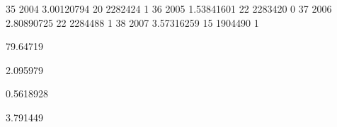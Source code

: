 \documentclass[a4paper]{article}                %
\begin{document}
\begin{Schunk}
\begin{Soutput}
35  2004         3.00120794     20 2282424               1
36  2005         1.53841601     22 2283420               0
37  2006         2.80890725     22 2284488               1
38  2007         3.57316259     15 1904490               1
\end{Soutput}
\begin{Soutput}
[1] 79.64719
\end{Soutput}
\begin{Soutput}
[1] 2.095979
\end{Soutput}
\begin{Soutput}
[1] 0.5618928
\end{Soutput}
\begin{Soutput}
[1] 3.791449
\end{Soutput}
\end{Schunk}
\end{document}
